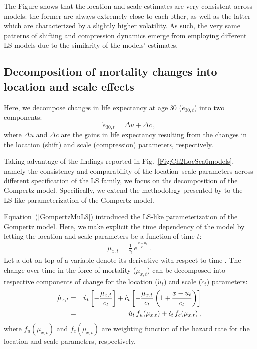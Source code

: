 \documentclass[Thesis]{subfiles}
\begin{document}
The Figure shows that the location and scale estimates are very consistent across models: the former are always extremely close to each other, as well as the latter which are characterized by a slightly higher volatility. As such, the very same patterns of shifting and compression dynamics emerge from employing different LS models due to the similarity of the models' estimates.


\subsection{Decomposition of mortality changes into location and scale effects}\label{Subsec:Ch2appE}

Here, we decompose changes in life expectancy at age 30 ($\dot{e}_{30,t}$) into two components:
\begin{equation}\label{Eq:DecomposeE30}
\dot{e}_{30,t} = \Delta u + \Delta c \, ,
\end{equation}
where $\Delta u$ and $\Delta c$ are the gains in life expectancy resulting from the changes in the location (shift) and scale (compression) parameters, respectively.

Taking advantage of the findings reported in Fig.~\ref{Fig:Ch2LocSca6models}, namely the consistency and comparability of the location--scale parameters across different specification of the LS family, we focus on the decomposition of the Gompertz model. Specifically, we extend the methodology presented by \cite{bergeron2015decomposing} to the LS-like parameterization of the Gompertz model.

Equation~(\ref{GompertzMuLS}) introduced the LS-like parameterization of the Gompertz model. Here, we make explicit the time dependency of the model by letting the location and scale parameters be a function of time $t$:
\begin{eqnarray}\label{Eq:GompertzMuLSt}
\mu_{x,t} = \frac{1}{c_t} \, e^{\frac{x-u_t}{c_t}} \, .
\end{eqnarray}
Let a dot on top of a variable denote its derivative with respect to time \citep{vaupel2003decomposing}. The change over time in the force of mortality ($\dot{\mu}_{x,t}$) can be decomposed
into respective components of change for the location ($\dot{u}_{t}$) and scale ($\dot{c}_{t}$) parameters:
\begin{eqnarray}\label{Eq:ChangeGompertzLS}
\dot{\mu}_{x,t} &=& \dot{u}_{t} \left[ - \frac{\mu_{x,t}}{c_t} \right] + \dot{c}_{t} \left[ - \frac{\mu_{x,t}}{c_t} \left(1 + \frac{x-u_t}{c_t}\right) \right] \notag \\
&=& \dot{u}_{t} \, f_u(\mu_{x,t}) +  \dot{c}_{t} \, f_c(\mu_{x,t}) \, ,
\end{eqnarray}
where $f_u(\mu_{x,t})$ and $f_c(\mu_{x,t})$ are weighting function of the hazard rate for the location and scale parameters, respectively. 
\end{document}
